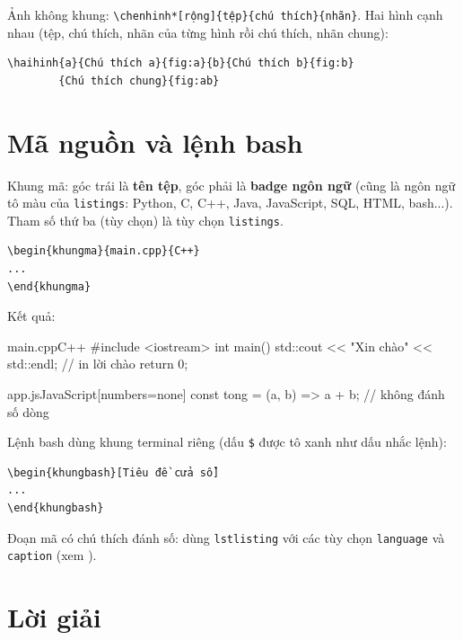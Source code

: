 Ảnh không khung: \verb|\chenhinh*[rộng]{tệp}{chú thích}{nhãn}|. Hai hình cạnh nhau
(tệp, chú thích, nhãn của từng hình rồi chú thích, nhãn chung):
\begin{lstlisting}[language={[LaTeX]TeX}, numbers=none]
\haihinh{a}{Chú thích a}{fig:a}{b}{Chú thích b}{fig:b}
        {Chú thích chung}{fig:ab}
\end{lstlisting}

\section{Mã nguồn và lệnh bash}

Khung mã: góc trái là \textbf{tên tệp}, góc phải là \textbf{badge ngôn ngữ}
(cũng là ngôn ngữ tô màu của \texttt{listings}: Python, C, C++, Java, JavaScript,
SQL, HTML, bash...). Tham số thứ ba (tùy chọn) là tùy chọn \texttt{listings}.
\begin{lstlisting}[language={[LaTeX]TeX}, numbers=none]
\begin{khungma}{main.cpp}{C++}
...
\end{khungma}
\end{lstlisting}
Kết quả:
\begin{khungma}{main.cpp}{C++}
#include <iostream>
int main() {
    std::cout << "Xin chào" << std::endl;   // in lời chào
    return 0;
}
\end{khungma}

\begin{khungma}{app.js}{JavaScript}[numbers=none]
const tong = (a, b) => a + b;   // không đánh số dòng
\end{khungma}

Lệnh bash dùng khung terminal riêng (dấu \texttt{\$} được tô xanh như dấu nhắc lệnh):
\begin{lstlisting}[language={[LaTeX]TeX}, numbers=none]
\begin{khungbash}[Tiêu đề cửa sổ]
...
\end{khungbash}
\end{lstlisting}

Đoạn mã có chú thích đánh số: dùng \texttt{lstlisting} với các tùy chọn
\texttt{language} và \texttt{caption} (xem ).

\section{Lời giải}

